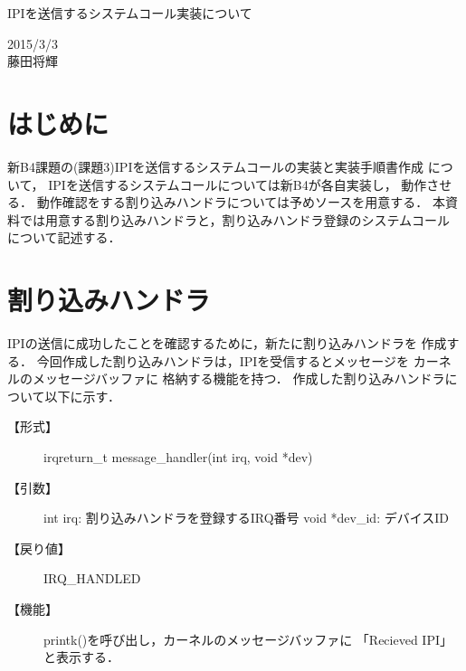 \documentclass[12pt]{jsarticle}
\begin{document}

\begin{center}
{\LARGE IPIを送信するシステムコール実装について}
\end{center}

\begin{flushright}
  2015/3/3\\
  藤田将輝
\end{flushright}
\section{はじめに}
新B4課題の(課題3)IPIを送信するシステムコールの実装と実装手順書作成
について，
IPIを送信するシステムコールについては新B4が各自実装し，
動作させる．
動作確認をする割り込みハンドラについては予めソースを用意する．
本資料では用意する割り込みハンドラと，割り込みハンドラ登録のシステムコール
について記述する．
\section{割り込みハンドラ}\label{interrupt_handler}
IPIの送信に成功したことを確認するために，新たに割り込みハンドラを
作成する．
今回作成した割り込みハンドラは，IPIを受信するとメッセージを
カーネルのメッセージバッファに
格納する機能を持つ．
作成した割り込みハンドラについて以下に示す．
\begin{description}
    \item[【形式】]irqreturn_t message_handler(int irq, void *dev)
    \item[【引数】]int irq: 割り込みハンドラを登録するIRQ番号
        void *dev_id: デバイスID
    \item[【戻り値】]IRQ_HANDLED
    \item[【機能】]printk()を呼び出し，カーネルのメッセージバッファに
        「Recieved IPI」と表示する．
\end{description}
\end{document}
